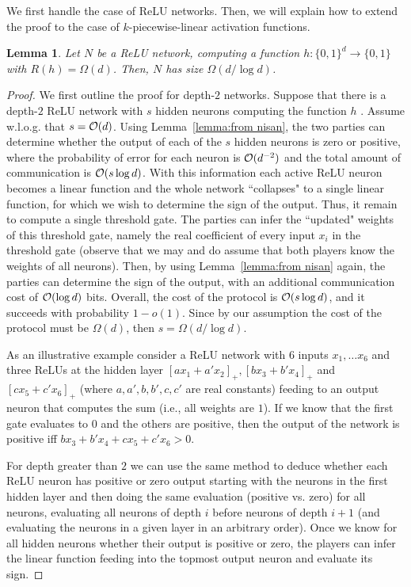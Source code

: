 \documentclass[11pt]{article}
\newtheorem{lemma}{Lemma}[section]
\newcommand{\co}{{\cal O}}
\begin{document}
We first handle the case of ReLU networks. Then, we will explain how to extend the proof to the case of $k$-piecewise-linear activation functions.
\begin{lemma}
\label{lemma:handle ReLU}
	Let $N$ be a ReLU network, computing a function $h:\{0,1\}^d \rightarrow \{0,1\}$ with $R(h)=\Omega(d)$. Then, $N$ has size $\Omega(d/\log d)$. 
\end{lemma}
\begin{proof}
	We first outline the proof for depth-$2$ networks.
	Suppose that there is a depth-$2$ ReLU network with $s$ hidden neurons computing the function $h$ . 
	Assume w.l.o.g. that $s=\co(d)$.
	Using Lemma~\ref{lemma:from nisan}, the two parties can determine whether the output of each of the $s$ hidden neurons is zero or positive, where the probability of error for each neuron is
	$\co(d^{-2})$ and the total amount of communication is $\co(s \log d)$. With this information each active ReLU neuron becomes a linear function and the whole network ``collapses" to a single linear function, for which we wish to determine the sign of the output. Thus, it remain to compute a single threshold gate. The parties can infer the ``updated" weights of this threshold gate, namely the real coefficient of every input $x_i$ in the threshold gate (observe that we may and do assume that both players know the weights of all neurons). Then, by using Lemma~\ref{lemma:from nisan} again, the parties can determine the sign of the output, with an additional communication cost of $\co(\log d)$ bits. Overall, the cost of the protocol is $\co(s \log d)$, and it succeeds with probability $1-o(1)$. Since by our assumption the cost of the protocol must be $\Omega(d)$, then $s=\Omega(d/\log d)$.
	
	As an illustrative example consider a ReLU network with $6$ inputs $x_1, \ldots x_6$ and three ReLUs at the hidden layer $[ax_1+a'x_2]_+, [bx_3+b'x_4]_+$ and $[cx_5+c'x_6]_+$ (where $a,a',b,b',c,c'$ are real constants) feeding to an output neuron that computes the sum (i.e., all weights are $1$). If we know that the first gate evaluates to $0$ and the others are positive, then the output of the network is positive iff $bx_3+b'x_4+cx_5+c'x_6 > 0$.

	For depth greater than $2$ we can use the same method to deduce whether each ReLU neuron has positive or zero output starting with the neurons in the first hidden layer and then doing the same evaluation (positive vs. zero) for all neurons, evaluating all neurons of depth $i$ before neurons of depth $i+1$ (and evaluating the neurons in a given layer in an arbitrary order). Once we know for all hidden neurons whether their output is positive or zero, the players can infer the linear function feeding into the topmost output neuron and evaluate its sign. 
\end{proof}
\end{document}
